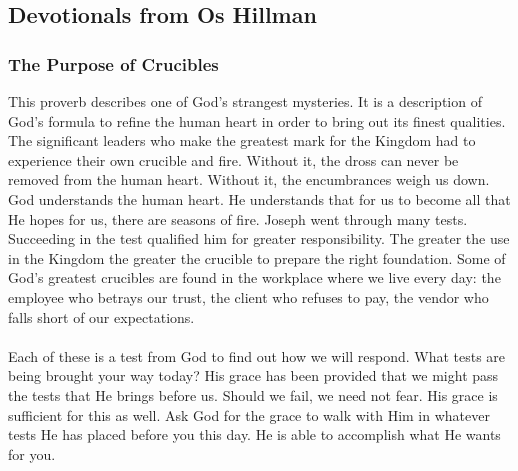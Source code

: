 \subsection{Devotionals from Os Hillman}


\subsubsection{The Purpose of Crucibles}


This proverb describes one of God's strangest mysteries. It is a description of God's formula to refine the human heart in order to bring out its finest qualities. The significant leaders who make the greatest mark for the Kingdom had to experience their own crucible and fire. Without it, the dross can never be removed from the human heart. Without it, the encumbrances weigh us down. God understands the human heart. He understands that for us to become all that He hopes for us, there are seasons of fire. Joseph went through many tests. Succeeding in the test qualified him for greater responsibility. The greater the use in the Kingdom the greater the crucible to prepare the right foundation. Some of God's greatest crucibles are found in the workplace where we live every day: the employee who betrays our trust, the client who refuses to pay, the vendor who falls short of our expectations.\\
\\
\noindent Each of these is a test from God to find out how we will respond. What tests are being brought your way today? His grace has been provided that we might pass the tests that He brings before us. Should we fail, we need not fear. His grace is sufficient for this as well. Ask God for the grace to walk with Him in whatever tests He has placed before you this day. He is able to accomplish what He wants for you.



